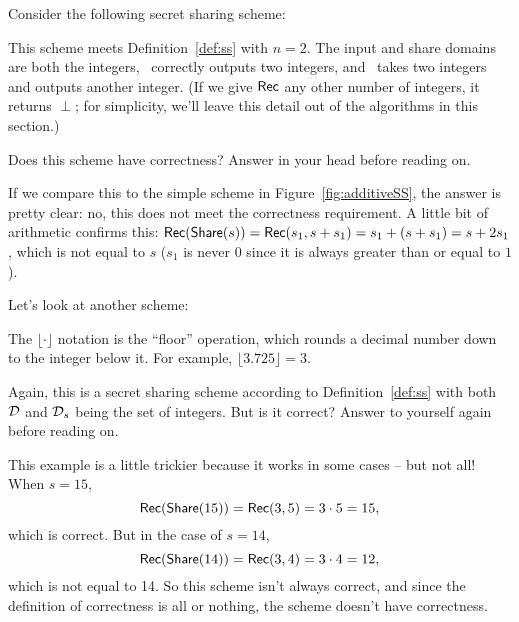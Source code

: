\begin{example}
    Consider the following secret sharing scheme:
    \begin{pchstack}[center]
    \pchspace
    \end{pchstack}
    This scheme meets Definition~\ref{def:ss} with $n=2$. The input and share domains
    are both the integers, \share~correctly outputs two integers, and 
    \rec~takes two integers and outputs another integer. (If we give $\mathsf{Rec}$
    any other number of integers, it returns $\perp$; for simplicity, we'll 
    leave this detail out of the algorithms in this section.)

    Does this scheme have correctness? Answer in your head before reading on.

    If we compare this to the simple scheme in Figure~\ref{fig:additiveSS},
    the answer is pretty clear: no, this does not meet the correctness 
    requirement. A little bit of arithmetic confirms this: $\mathsf{Rec}(\mathsf{Share}(s))
    = \mathsf{Rec}(s_1, s+s_1) = s_1 + (s+s_1) = s + 2s_1$, which is not equal to $s$
    ($s_1$ is never 0 since it is always greater than or equal to $1$). 
\end{example}

\begin{example}\label{ex:floor3}
    Let's look at another scheme:
    \begin{pchstack}[center]
    \pchspace
    \end{pchstack}
    The $\lfloor \cdot \rfloor$ notation is the ``floor'' operation, which 
    rounds a decimal number down to the integer below it. For example, $\lfloor 3.725 
    \rfloor = 3$.

    Again, this is a secret sharing scheme according to Definition~\ref{def:ss}
    with both $\mathcal{D}$ and $\mathcal{D}_s$ being the set of integers.
    But is it correct? Answer to yourself again before reading on.

    This example is a little trickier because it works in some cases -- but not all! 
    When $s=15$, 
    \[
        \mathsf{Rec}(\mathsf{Share}(15)) = \mathsf{Rec}(3,5) = 3\cdot 5 = 15,
    \]
    which is correct.
    But in the case of $s=14$, 
    \[
        \mathsf{Rec}(\mathsf{Share}(14)) = \mathsf{Rec}(3, 4) = 3 \cdot 4 = 12,
    \]
    which is not equal to 14.
    So this scheme isn't always correct, and since the definition of correctness 
    is all or nothing\footnotemark, the scheme doesn't have correctness.
\end{example}

